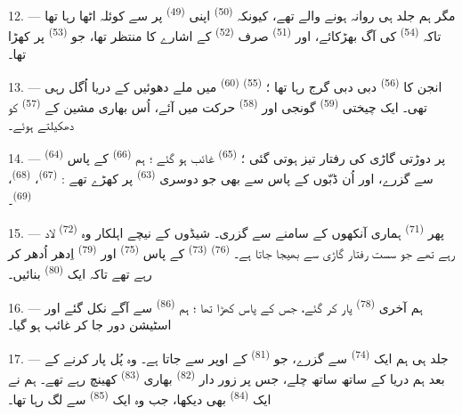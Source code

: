 12. --- مگر ہم جلد ہی روانہ ہونے والے تھے، کیونکہ  \textsuperscript{(50)} اپنی 
\textsuperscript{(49)} پر سے کوئلہ اٹھا رہا تھا تاکہ 
\textsuperscript{(54)} کی آگ بھڑکائے، اور 
\textsuperscript{(51)} صرف 
\textsuperscript{(52)} کے اشارے کا منتظر تھا، جو 
\textsuperscript{(53)} پر کھڑا تھا۔

13. --- انجن کا  \textsuperscript{(56)} دبی دبی گرج رہا
تھا ؛  \textsuperscript{(55)} 
\textsuperscript{(60)} میں ملے دھوئیں کے دریا اُگل رہی تھی۔ ایک
چیختی  \textsuperscript{(59)} گونجی اور 
\textsuperscript{(58)} حرکت میں آئے، اُس بھاری مشین کے 
\textsuperscript{(57)} کو دھکیلتے ہوئے۔

\VUsaut{3.0mm}
\VUsaut{3.0mm}

14. ---  \textsuperscript{(64)} پر دوڑتی گاڑی کی رفتار
تیز ہوتی گئی ؛  \textsuperscript{(65)} غائب ہو گئے ؛
ہم  \textsuperscript{(66)} کے پاس سے گزرے، اور اُن
ڈبّوں کے پاس سے بھی جو دوسری  \textsuperscript{(63)} پر
کھڑے تھے :  \textsuperscript{(67)}،
 \textsuperscript{(68)}، 
\textsuperscript{(69)}۔


15. --- پھر  \textsuperscript{(71)} ہماری آنکھوں کے
سامنے سے گزری۔ شیڈوں کے نیچے اہلکار وہ 
\textsuperscript{(72)} لاد رہے تھے جو سست رفتار گاڑی سے بھیجا جاتا ہے۔
 \textsuperscript{(76)} 
\textsuperscript{(73)} کے پاس 
\textsuperscript{(75)} اور  \textsuperscript{(79)}
اِدھر اُدھر کر رہے تھے تاکہ ایک 
\textsuperscript{(80)} بنائیں۔

16. --- ہم آخری  \textsuperscript{(78)} پار کر
گئے، جس کے پاس  کھڑا تھا ؛ ہم 
\textsuperscript{(86)} سے آگے نکل گئے اور اسٹیشن دور جا کر غائب ہو
گیا۔

17. --- جلد ہی ہم ایک  \textsuperscript{(74)} سے
گزرے، جو  \textsuperscript{(81)} کے اوپر سے جاتا ہے۔ وہ
پُل پار کرنے کے بعد ہم دریا کے ساتھ ساتھ چلے، جس پر زور دار
 \textsuperscript{(82)} بھاری 
\textsuperscript{(83)} کھینچ رہے تھے۔ ہم نے ایک 
\textsuperscript{(84)} بھی دیکھا، جب وہ ایک 
\textsuperscript{(85)} سے لگ رہا تھا۔

